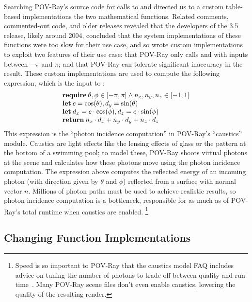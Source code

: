 \documentclass[paper.tex]{subfiles}
\begin{document}
Searching POV-Ray's source code for calls to  and 
  directed us to a custom table-based implementations
  the two mathematical functions.
Related comments, commented-out code, and older releases
  revealed that the developers of the 3.5 release, likely around 2004,
  concluded that the system implementations of these functions
  were too slow for their use case, and so wrote custom implementations
  to exploit two features of their use case:
  that POV-Ray only calls  and  with inputs between $-\pi$ and $\pi$;
  and that POV-Ray can tolerate significant inaccuracy in the result.
These custom implementations are used to compute the following expression,
  which is the input to \name:
\begin{equation}\label{povprog}
\begin{array}{l}
 \text{\textbf{require}}\: \theta, \phi \in [-\pi, \pi] \land n_x, n_y, n_z \in [-1, 1] \\
  \text{\textbf{let}}\: c = \cos(\theta), d_y = \sin(\theta)           \\
  \text{\textbf{let}}\:  d_x = c \cdot \cos(\phi), d_z = c \cdot \sin(\phi) \\
  \text{\textbf{return}}\:  n_x \cdot d_x + n_y \cdot d_y + n_z \cdot d_z
\end{array}
\end{equation}
This expression is the ``photon incidence computation'' in POV-Ray's ``caustics'' module.
Caustics are light effects like the lensing effects of glass or the
  pattern at the bottom of a swimming pool;
  to model these, POV-Ray shoots virtual photons at the scene
  and calculates how these photons move using the photon incidence computation.
The expression above computes the reflected energy
  of an incoming photon (with direction given by $\theta$ and $\phi$)
  reflected from a surface with normal vector $n$.
Millions of photon paths must be used to achieve realistic results,
  so photon incidence computation is a bottleneck,
  responsible for as much as \nPovRayPhotonsPercent of POV-Ray's total runtime
  when caustics are enabled.%
\footnote{
Speed is so important to POV-Ray
  that the caustics model FAQ includes advice
  on tuning the number of photons to trade off
  between quality and run time~\cite{povray-wiki}.
Many POV-Ray scene files don't even enable caustics,
  lowering the quality of the resulting render.
}

\subsection{Changing Function Implementations}
\end{document}

